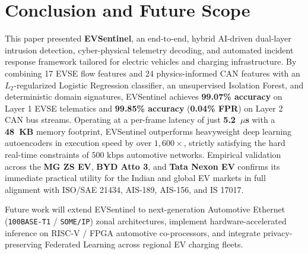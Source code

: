 \documentclass[conference]{IEEEtran}
\begin{document}
\section{Conclusion and Future Scope}
This paper presented \textbf{EVSentinel}, an end-to-end, hybrid AI-driven dual-layer intrusion detection, cyber-physical telemetry decoding, and automated incident response framework tailored for electric vehicles and charging infrastructure. By combining 17 EVSE flow features and 24 physics-informed CAN features with an $L_2$-regularized Logistic Regression classifier, an unsupervised Isolation Forest, and deterministic domain signatures, EVSentinel achieves \textbf{99.07\% accuracy} on Layer 1 EVSE telematics and \textbf{99.85\% accuracy} (\textbf{0.04\% FPR}) on Layer 2 CAN bus streams. Operating at a per-frame latency of just \textbf{5.2~$\mu$s} with a \textbf{48~KB} memory footprint, EVSentinel outperforms heavyweight deep learning autoencoders in execution speed by over $1,600\times$, strictly satisfying the hard real-time constraints of $500\text{ kbps}$ automotive networks. Empirical validation across the \textbf{MG ZS EV}, \textbf{BYD Atto 3}, and \textbf{Tata Nexon EV} confirms its immediate practical utility for the Indian and global EV markets in full alignment with ISO/SAE 21434, AIS-189, AIS-156, and IS 17017.

Future work will extend EVSentinel to next-generation Automotive Ethernet (\texttt{100BASE-T1} / \texttt{SOME/IP}) zonal architectures, implement hardware-accelerated inference on RISC-V / FPGA automotive co-processors, and integrate privacy-preserving Federated Learning across regional EV charging fleets.
\end{document}
